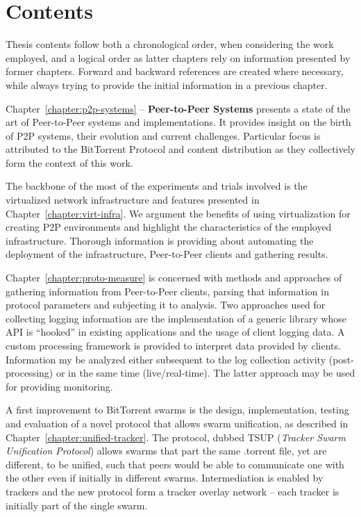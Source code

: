 \section{Contents}
\label{sec:intro:contents}

Thesis contents follow both a chronological order, when considering the work
employed, and a logical order as latter chapters rely on information presented
by former chapters. Forward and backward references are created where
necessary, while always trying to provide the initial information in a
previous chapter.

Chapter~\ref{chapter:p2p-systems} -- \textbf{Peer-to-Peer Systems} presents a
state of the art of Peer-to-Peer systems and implementations. It provides
insight on the birth of P2P systems, their evolution and current challenges.
Particular focus is attributed to the BitTorrent Protocol and content
distribution as they collectively form the context of this work.

The backbone of the most of the experiments and trials involved is the
virtualized network infrastructure and features presented in
Chapter~\ref{chapter:virt-infra}. We argument the benefits of using
virtualization for creating P2P environments and highlight the characteristics
of the employed infrastructure. Thorough information is providing about
automating the deployment of the infrastructure, Peer-to-Peer clients and
gathering results.

Chapter~\ref{chapter:proto-measure} is concerned with methods and approaches
of gathering information from Peer-to-Peer clients, parsing that information
in protocol parameters and subjecting it to analysis. Two approaches used for
collecting logging information are the implementation of a generic library
whose API is ``hooked'' in existing applications and the usage of client
logging data. A custom processing framework is provided to interpret data
provided by clients. Information my be analyzed either subsequent to the log
collection activity (post-processing) or in the same time (live/real-time).
The latter approach may be used for providing monitoring.

A first improvement to BitTorrent swarms is the design, implementation,
testing and evaluation of a novel protocol that allows swarm unification, as
described in Chapter~\ref{chapter:unified-tracker}. The protocol, dubbed TSUP
(\textit{Tracker Swarm Unification Protocol}) allows swarms that part the same
.torrent file, yet are different, to be unified, such that peers would be able
to communicate one with the other even if initially in different swarms.
Intermediation is enabled by trackers and the new protocol form a tracker
overlay network -- each tracker is initially part of the single swarm.

